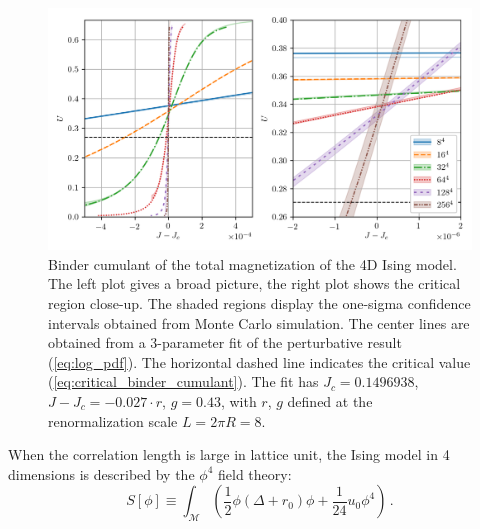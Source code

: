 \documentclass[11pt,a4paper]{article}
\begin{document}
\begin{figure}
\begin{center}
\includegraphics[scale=0.75]{binder_cumulant.png}
\end{center}
    \caption{\label{fig:binder_cumulant} Binder cumulant of the total
    magnetization of the 4D Ising model. The left plot gives a broad picture,
    the right plot shows the critical region close-up.  The shaded regions
    display the one-sigma confidence intervals obtained from Monte Carlo
    simulation. The center lines are obtained from a 3-parameter fit of the
    perturbative result (\ref{eq:log_pdf}). The horizontal dashed line
    indicates the critical value (\ref{eq:critical_binder_cumulant}). The fit
    has $J_c = 0.1496938$, $J - J_c = -0.027\cdot r$, $g = 0.43$, with $r$, $g$
    defined at the renormalization scale $L = 2\pi R = 8$. }
\end{figure}


When the correlation length is large in lattice unit, the Ising model in 4
dimensions is described by the $\phi^4$ field theory:
\begin{equation}
    S[\phi] \equiv \int_{\mathcal{M}} \left(
    \frac{1}{2} \phi\left(\Delta + r_0\right)\phi +
    \frac{1}{24} u_0 \phi^4\right)\,.
\end{equation}
\end{document}
